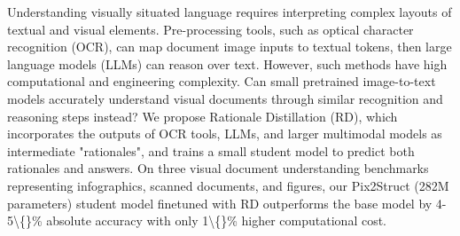 Understanding visually situated language requires interpreting complex layouts of textual and visual elements.  Pre-processing tools, such as optical character recognition (OCR), can map document image inputs to textual tokens, then large language models (LLMs) can reason over text. However, such methods have high computational and engineering complexity.  Can small pretrained image-to-text models accurately understand visual documents through similar recognition and reasoning steps instead? We propose Rationale Distillation (RD), which incorporates the outputs of OCR tools, LLMs, and larger multimodal models as intermediate "rationales", and trains a small student model to predict both rationales and answers.  On three visual document understanding benchmarks representing infographics, scanned documents, and figures, our Pix2Struct (282M parameters) student model finetuned with RD outperforms the base model by 4-5\textbackslash\{\}\% absolute accuracy with only 1\textbackslash\{\}\% higher computational cost.